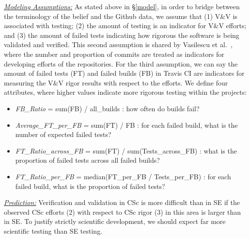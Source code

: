 \documentclass[conference,10pt]{IEEEtran}
\newcommand{\bi}{\begin{itemize}}
\newcommand{\ei}{\end{itemize}}
\begin{document}
\noindent\textit{\underline{Modeling Assumptions:}} 
As stated above in \S\ref{model},
in order to bridge between the terminology of the belief and the Github data, we assume that (1) V\&V is associated with testing; (2) the amount of testing is an indicator for V\&V efforts; and (3) the amount of failed tests indicating how rigorous the software is being validated and verified. This second assumption is shared by Vasilescu et al.~\cite{vasilescu16_limit, xia2019sequential}, where the number and proportion of commits are treated as indicators for developing efforts of the repositories. For the third assumption, we can say the amount of failed tests (FT) and failed builds (FB) in Travis CI are indicators for measuring the V\&V rigor results with respect to the efforts. We define four attributes, where higher values indicate more rigorous testing within the projects:

\bi
 \item  \textit{FB\_Ratio} = sum(FB) / all\_builds : how often do builds fail? 
 \item  \textit{Average\_FT\_per\_FB} = sum(FT) / FB : for each failed build, what is the number of expected failed tests? 
 \item  \textit{FT\_Ratio\_across\_FB} = sum(FT) / sum(Tests\_across\_FB) : what is the proportion of failed tests across all failed builds? 
 \item  \textit{FT\_Ratio\_per\_FB} = median(FT\_per\_FB / Tests\_per\_FB) : for each failed build, what is the proportion of failed tests?
\ei

\noindent \textit{\underline{Prediction:}}
Verification and validation in CSc is more
difficult than in SE if the observed CSc efforts (2) with respect to CSc rigor (3) in this area
is larger than in SE. To justify strictly scientific development, we should expect far more scientific
testing than SE testing. 
\end{document}
